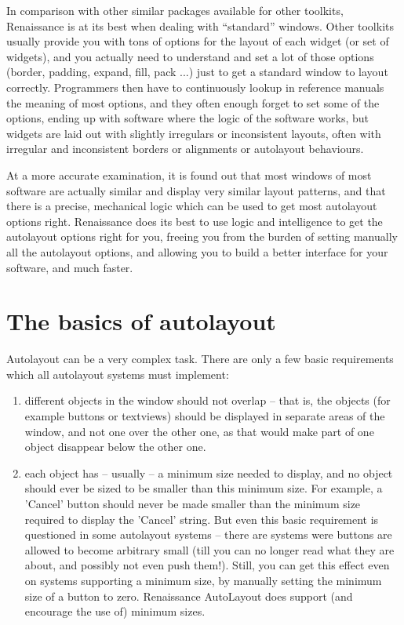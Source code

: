 In comparison with other similar packages available for other
toolkits, Renaissance is at its best when dealing with ``standard''
windows.  Other toolkits usually provide you with tons of options for
the layout of each widget (or set of widgets), and you actually need
to understand and set a lot of those options (border, padding, expand,
fill, pack ...) just to get a standard window to layout correctly.
Programmers then have to continuously lookup in reference manuals the
meaning of most options, and they often enough forget to set some of
the options, ending up with software where the logic of the software
works, but widgets are laid out with slightly irregulars or
inconsistent layouts, often with irregular and inconsistent borders or
alignments or autolayout behaviours.

At a more accurate examination, it is found out that most windows of
most software are actually similar and display very similar layout
patterns, and that there is a precise, mechanical logic which can be
used to get most autolayout options right.  Renaissance does its best to
use logic and intelligence to get the autolayout options right for
you, freeing you from the burden of setting manually all the
autolayout options, and allowing you to build a better interface for
your software, and much faster.


\section{The basics of autolayout}

Autolayout can be a very complex task.  There are only a few basic
requirements which all autolayout systems must implement:
\begin{enumerate}

\item different objects in the window should not overlap -- that is, 
the objects (for example buttons or textviews) should be displayed in
separate areas of the window, and not one over the other one, as that
would make part of one object disappear below the other one.

\item each object has -- usually -- a minimum size needed to display, 
and no object should ever be sized to be smaller than this minimum
size.  For example, a 'Cancel' button should never be made smaller
than the minimum size required to display the 'Cancel' string.  But
even this basic requirement is questioned in some autolayout systems
-- there are systems were buttons are allowed to become arbitrary
small (till you can no longer read what they are about, and possibly
not even push them!).  Still, you can get this effect even on systems
supporting a minimum size, by manually setting the minimum size of a
button to zero.  Renaissance AutoLayout does support (and encourage
the use of) minimum sizes.
\end{enumerate}

